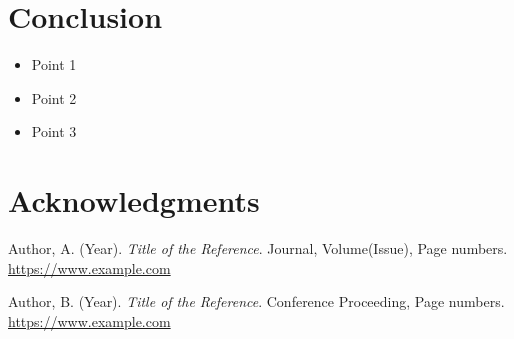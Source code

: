 \documentclass{article}
\begin{document}
\lipsum[4] %

\section{Conclusion}
\begin{keypoints}
\begin{itemize}
  \item Point 1
  \item Point 2
  \item Point 3
\end{itemize}
\end{keypoints}

\lipsum[5] %

\section*{Acknowledgments} %
\lipsum[6] %

\begin{thebibliography}{9}
Author, A. (Year). \textit{Title of the Reference}. Journal, Volume(Issue), Page numbers. \url{https://www.example.com}

Author, B. (Year). \textit{Title of the Reference}. Conference Proceeding, Page numbers. \url{https://www.example.com}
\end{thebibliography}
\end{document}
